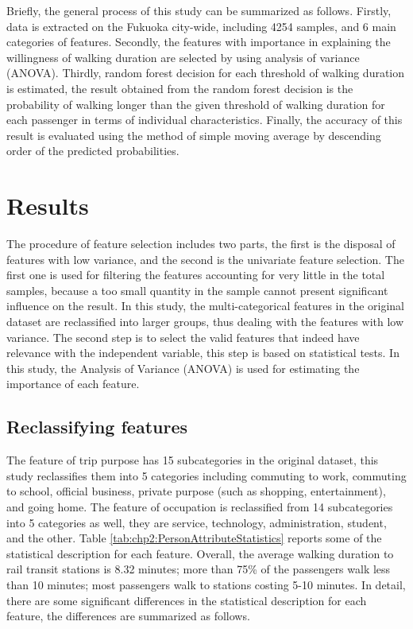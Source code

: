 %
Briefly, the general process of this study can be summarized as follows. Firstly, data is extracted on the Fukuoka city-wide, including 4254 samples, and 6 main categories of features. Secondly, the features with importance in explaining the willingness of walking duration are selected by using analysis of variance (ANOVA). Thirdly, random forest decision for each threshold of walking duration is estimated, the result obtained from the random forest decision is the probability of walking longer than the given threshold of walking duration for each passenger in terms of individual characteristics. Finally, the accuracy of this result is evaluated using the method of simple moving average by descending order of the predicted probabilities.

%
\section{Results}
The procedure of feature selection includes two parts, the first is the disposal of features with low variance, and the second is the univariate feature selection. The first one is used for filtering the features accounting for very little in the total samples, because a too small quantity in the sample cannot present significant influence on the result. In this study, the multi-categorical features in the original dataset are reclassified into larger groups, thus dealing with the features with low variance. The second step is to select the valid features that indeed have relevance with the independent variable, this step is based on statistical tests. In this study, the Analysis of Variance (ANOVA) is used for estimating the importance of each feature.

%
\subsection{Reclassifying features}
The feature of trip purpose has 15 subcategories in the original dataset, this study reclassifies them into 5 categories including commuting to work, commuting to school, official business, private purpose (such as shopping, entertainment), and going home. The feature of occupation is reclassified from 14 subcategories into 5 categories as well, they are service, technology, administration, student, and the other. Table \ref{tab:chp2:PersonAttributeStatistics} reports some of the statistical description for each feature. Overall, the average walking duration to rail transit stations is 8.32 minutes; more than 75\% of the passengers walk less than 10 minutes; most passengers walk to stations costing 5-10 minutes. In detail, there are some significant differences in the statistical description for each feature, the differences are summarized as follows.


